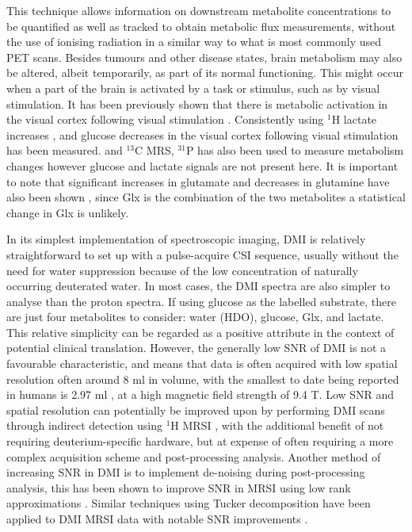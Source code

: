 This technique allows information on downstream metabolite concentrations to be quantified as well as tracked to obtain metabolic flux measurements, without the use of ionising radiation in a similar way to what is most commonly used \ac{PET} scans. Besides tumours and other disease states, brain metabolism may also be altered, albeit temporarily, as part of its normal functioning. This might occur when a part of the brain is activated by a task or stimulus, such as by visual stimulation. It has been previously shown that there is metabolic activation in the visual cortex following visual stimulation \cite{Kushner1988CerebralStimulation, Beland-Millar2018FluctuationsStimulation}. Consistently using $^1$H lactate increases \cite{Prichard1991LactateStimulation., Sappey-Marinier1992EffectSpectroscopy, Fernandes2020MeasurementT}, and glucose decreases \cite{Lin2012InvestigatingT} in the visual cortex following visual stimulation has been measured. and $^{13}$C \cite{Chhina2001MeasurementSpectroscopy} \ac{MRS}, $^{31}$P has also been used to measure metabolism changes \cite{Sappey-Marinier1992EffectSpectroscopy} however glucose and lactate signals are not present here. It is important to note that significant increases in glutamate and decreases in glutamine have also been shown \cite{Lin2012InvestigatingT}, since Glx is the combination of the two metabolites a statistical change in Glx is unlikely. 
 
In its simplest implementation of spectroscopic imaging, \ac{DMI} is relatively straightforward to set up with a pulse-acquire \ac{CSI} sequence, usually without the need for water suppression because of the low concentration of naturally occurring deuterated water. In most cases, the \ac{DMI} spectra are also simpler to analyse than the proton spectra. If using glucose as the labelled substrate, there are just four metabolites to consider: water (\ac{HDO}), glucose, Glx, and lactate. This relative simplicity can be regarded as a positive attribute in the context of potential clinical translation. However, the generally low \ac{SNR} of \ac{DMI} is not a favourable characteristic, and means that data is often acquired with low spatial resolution often around 8 ml \cite{DeFeyter2021DeuteriumFuture, deGraaf2020OnImaging} in volume, with the smallest to date being reported in humans is 2.97 ml \cite{Ruhm2022Dynamic9.4T}, at a high magnetic field strength of 9.4 T. Low \ac{SNR} and spatial resolution can potentially be improved upon by performing \ac{DMI} scans through indirect detection using $^1$H \ac{MRSI} \cite{vanZijl2020SpectroscopicFluxes, Bednarik2021DeuteriumBrain, Niess2023Reproducibility3T, Ruhm2022Dynamic9.4T}, with the additional benefit of not requiring deuterium-specific hardware, but at expense of often requiring a more complex acquisition scheme and post-processing analysis. Another method of increasing \ac{SNR} in \ac{DMI} is to implement de-noising during post-processing analysis, this has been shown to improve \ac{SNR} in \ac{MRSI} using low rank approximations \cite{Nguyen2013DenoisingApproximations}. Similar techniques using Tucker decomposition \cite{Tucker1966SomeAnalysis, Bader2007EfficientTensors} have been applied to \ac{DMI} \ac{MRSI} data with notable \ac{SNR} improvements \cite{vonMorze2021ComparisonT, Kreis2020MeasuringMRI}.

